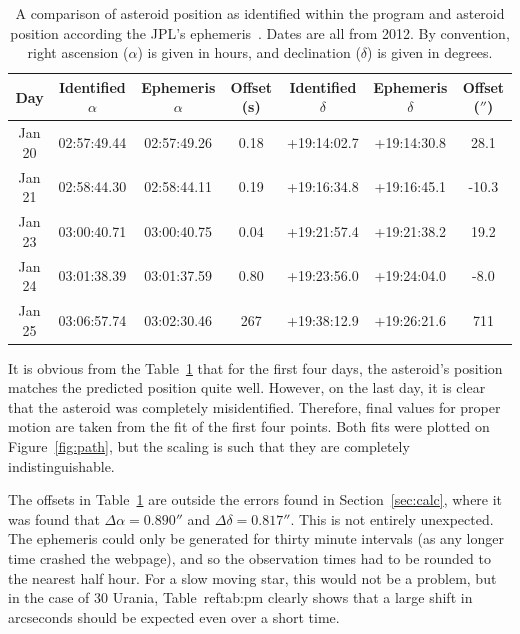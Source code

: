 \documentclass[a4paper,12pt]{article}
\begin{document}
\begin{center}
\begin{table}[!htbp]
  \centering
  \begin{tabular}{c||c||c||c||c||c||c}
  	Day & Identified $\alpha$ & Ephemeris $\alpha$ & Offset (s) & Identified $\delta$ & Ephemeris $\delta$ & Offset ($''$)\\
  	\hline
  	Jan 20 & 02:57:49.44 & 02:57:49.26 & 0.18 & +19:14:02.7 & +19:14:30.8 & 28.1\\
  	\hline
  	Jan 21 & 02:58:44.30 & 02:58:44.11 & 0.19 & +19:16:34.8 & +19:16:45.1 & -10.3\\
  	\hline
  	Jan 23 & 03:00:40.71 & 03:00:40.75 & 0.04 & +19:21:57.4 & +19:21:38.2 & 19.2\\
  	\hline
  	Jan 24 & 03:01:38.39 & 03:01:37.59 & 0.80 & +19:23:56.0 & +19:24:04.0 & -8.0\\
  	\hline
  	Jan 25 & 03:06:57.74 & 03:02:30.46 & 267 & +19:38:12.9 & +19:26:21.6 & 711\\
   \end{tabular}
    \caption{A comparison of asteroid position as identified within the program and asteroid position according the JPL's ephemeris~\citep{urania}. Dates are all from 2012. By convention, right ascension ($\alpha$) is given in hours, and declination ($\delta$) is given in degrees.}
    \label{tab:position}
\end{table}
\end{center}

It is obvious from the Table~\ref{tab:position} that for the first four days, the asteroid's position matches the predicted position quite well. However, on the last day, it is clear that the asteroid was completely misidentified. Therefore, final values for proper motion are taken from the fit of the first four points. Both fits were plotted on Figure~\ref{fig:path}, but the scaling is such that they are completely indistinguishable.

The offsets in Table~\ref{tab:position} are outside the errors found in Section~\ref{sec:calc}, where it was found that $\Delta\alpha = 0.890''$ and $\Delta\delta = 0.817''$. This is not entirely unexpected. The ephemeris could only be generated for thirty minute intervals (as any longer time crashed the webpage), and so the observation times had to be rounded to the nearest half hour. For a slow moving star, this would not be a problem, but in the case of 30 Urania, Table~ref{tab:pm} clearly shows that a large shift in arcseconds should be expected even over a short time.



\end{document}
